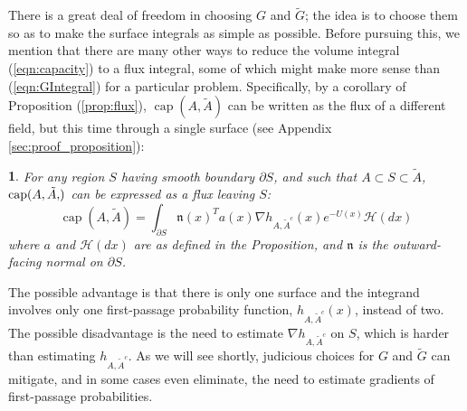 \documentclass[12pt, nofootinbib,english, amsmath, amssymb, aps, priprint, graphicx,floatfix]{revtex4-1}
\theoremstyle{plain}
\theoremstyle{definition}
\theoremstyle{plain}
\newtheorem{cor}[thm]{\protect\corollaryname}
\newcommand{\normal}{{\mathfrak{n}}}
\newcommand{\capac}[2]{\ensuremath{\operatorname{cap}}(#1,#2)}
\newcommand{\hausdorffmeasure}{\mathscr{H}(dx)}
\providecommand{\corollaryname}{Corollary}
\newcommand{\tA}{{\tilde A}}
\begin{document}
There is a great deal of freedom in choosing $G$ and $\tilde G$; the idea is to choose them so as to make the surface integrals as simple as possible. Before pursuing this, we mention that there are many other ways to reduce the volume integral (\ref{eqn:capacity}) to a flux integral, some of which might make more sense than (\ref{eqn:GIntegral}) for a particular problem. Specifically, by a corollary of 
Proposition (\ref{prop:flux}), $\capac{A}{\tilde A}$ can be written as the flux of a different field, but this time through a single surface (see Appendix \ref{sec:proof_proposition}):
\begin{cor}
\label{cor:flux}
For any region $S$ having smooth boundary $\partial S$, and such that $A\subset S \subset \tilde A$, $\capac{A,\tA}$ can be expressed as a flux leaving $S$:
\begin{equation}
\ensuremath{\operatorname{cap}} (A, \tilde{A}) = \int_{\partial S}   \normal(x)^T a (x) \nabla h_{A, \tilde{A}^c} (x)e^{- U (x)} \hausdorffmeasure
\end{equation}
where $a$ and $\hausdorffmeasure$ are as defined in the Proposition, and  $\normal$ is the outward-facing normal on $\partial S$.
\end{cor}
\noindent
The possible advantage is that there is only one surface and the integrand involves only one first-passage probability function, $h_{A, \tilde{A}^c} (x)$, instead of two. The possible disadvantage is the need to estimate $\nabla h_{A, \tilde{A}^c}$ on $S$, which is harder than estimating $h_{A, \tilde{A}^c}$. As we will see shortly, judicious choices for $G$ and $\tilde G$ can mitigate, and in some cases even eliminate, the need to estimate gradients of first-passage probabilities.
\end{document}
